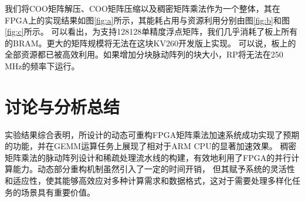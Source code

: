 我们将COO矩阵解压、COO矩阵压缩以及稠密矩阵乘法作为一个整体，其在FPGA上的实现结果如图\ref{fig:a}所示，其能耗占用与资源利用分别由图\ref{fig:b}和图\ref{fig:c}所示。
可以看出，为支持128\texttimes{}128单精度浮点矩阵，我们几乎消耗了板上所有的BRAM。更大的矩阵规模将无法在这块KV260开发版上实现。
可以说，板上的全部资源都已被高效利用。如果增加分块脉动阵列的块大小，RP将无法在250 MHz的频率下运行。

\section{讨论与分析总结}

实验结果综合表明，所设计的动态可重构FPGA矩阵乘法加速系统成功实现了预期的功能，并在GEMM运算任务上展现了相对于ARM CPU的显著加速效果。
稠密矩阵乘法的脉动阵列设计和稀疏处理流水线的构建，有效地利用了FPGA的并行计算能力。动态部分重构机制虽然引入了一定的时间开销，
但其赋予系统的灵活性和适应性，使其能够高效应对多种计算需求和数据格式，这对于需要处理多样化任务的场景具有重要价值。

